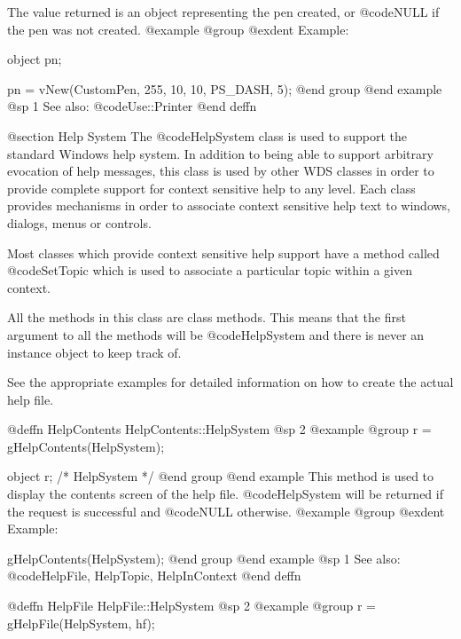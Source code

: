 The value returned is an object representing the pen created, or
@code{NULL} if the pen was not created.
@example
@group
@exdent Example:

object  pn;

pn = vNew(CustomPen, 255, 10, 10, PS_DASH, 5);
@end group
@end example
@sp 1
See also:  @code{Use::Printer}
@end deffn




@section Help System
The @code{HelpSystem} class is used to support the standard Windows
help system.  In addition to being able to support arbitrary evocation
of help messages, this class is used by other WDS classes in order to
provide complete support for context sensitive help to any level.
Each class provides mechanisms in order to associate context sensitive
help text to windows, dialogs, menus or controls.

Most classes which provide context sensitive help support have a method
called @code{SetTopic} which is used to associate a particular topic
within a given context.

All the methods in this class are class methods.  This means that
the first argument to all the methods will be @code{HelpSystem} and
there is never an instance object to keep track of.

See the appropriate examples for detailed information on how to
create the actual help file.











@deffn {HelpContents} HelpContents::HelpSystem
@sp 2
@example
@group
r = gHelpContents(HelpSystem);

object  r;      /*  HelpSystem  */
@end group
@end example
This method is used to display the contents screen of the help file.
@code{HelpSystem} will be returned if the request is successful and
@code{NULL} otherwise.
@example
@group
@exdent Example:

gHelpContents(HelpSystem);
@end group
@end example
@sp 1
See also:  @code{HelpFile, HelpTopic, HelpInContext}
@end deffn















@deffn {HelpFile} HelpFile::HelpSystem
@sp 2
@example
@group
r = gHelpFile(HelpSystem, hf);

